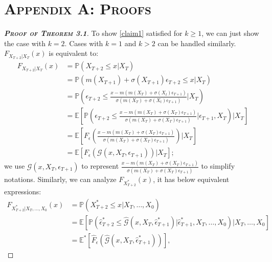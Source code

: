 \documentclass[a4paper]{article}
\begin{document}
\section*{\textsc{Appendix A: Proofs}}\label{Appendix:Proof}
\begin{proof}[\textbf{\textsc{Proof of Theorem 3.1}}]
To show \cref{claim1} satisfied for $k\geq1$, we can just show the case with $k=2$. Cases with $k=1$ and $k>2$ can be handled similarly. $F_{X_{T+2}|X_T}(x)$ is equivalent to:
\begin{equation}\label{truedis}
\begin{split}
    F_{X_{T+2}|X_T}(x) &=  \mathbb{P}(X_{T+2}\leq x|X_T)\\
      &=  \mathbb{P}(m(X_{T+1}) + \sigma(X_{T+1})\epsilon_{T+2}\leq x|X_T)\\
    & = \mathbb{P}\left(\epsilon_{T+2}\leq \frac{x - m(m(X_{T})+\sigma(X_t)\epsilon_{T+1})}{\sigma(m(X_{T})+\sigma(X_t)\epsilon_{T+1})}\bigg\vert X_T\right)\\
    & = \mathbb{E}\left[\mathbb{P}\left(\epsilon_{T+2}\leq \frac{x - m(m(X_{T})+\sigma(X_{T})\epsilon_{T+1})}{\sigma(m(X_{T})+\sigma(X_{T})\epsilon_{T+1})}\bigg\vert\epsilon_{T+1},X_T\right)\bigg\vert X_T\right]\\
    & = \mathbb{E}\left[F_{\epsilon}\left(\frac{x - m(m(X_{T})+\sigma(X_{T})\epsilon_{T+1})}{\sigma(m(X_{T})+\sigma(X_{T})\epsilon_{T+1})}\right)\bigg\vert X_T\right]\\
    & = \mathbb{E}\left[F_{\epsilon}\left( \mathcal{G}(x,X_T,\epsilon_{T+1})   \right)\bigg\vert X_T\right];
\end{split}
\end{equation}
we use $\mathcal{G}(x,X_T,\epsilon_{T+1}) $ to represent $\frac{x - m(m(X_{T})+\sigma(X_{T})\epsilon_{T+1})}{\sigma(m(X_{T})+\sigma(X_{T})\epsilon_{T+1})}$ to simplify notations. Similarly, we can analyze $F_{X_{T+2}^{*}}(x)$, it has below equivalent expressions:
\begin{equation}\label{bootdis}
\begin{split}
    F_{X^*_{T+2}|X_T,\ldots,X_0}(x) &=  \mathbb{P}(X^*_{T+2}\leq x|X_T,\ldots,X_0)\\
    & = \mathbb{E}\left[\mathbb{P}\left(\hat{\epsilon}^*_{T+2}\leq \widehat{\mathcal{G}}(x, X_T,\hat{\epsilon}^*_{T+1})\bigg\vert \hat{\epsilon}^*_{T+1},X_T,\ldots,X_0\right)\bigg\vert X_T,\ldots,X_0\right]\\
    & = \mathbb{E}^*\left[\widehat{F}_{\epsilon}\left(\widehat{\mathcal{G}}(x, X_T,\hat{\epsilon}^*_{T+1})\right)\right],
\end{split}

\end{equation}
\end{proof}
\end{document}
